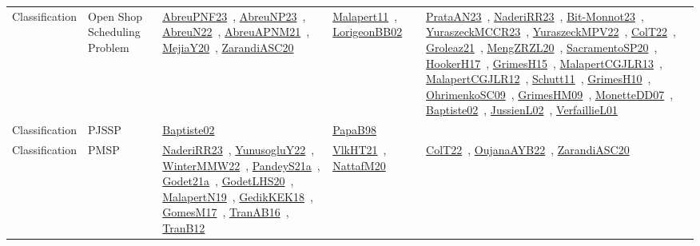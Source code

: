 {\begin{longtable}{lp{3cm}>{\raggedright\arraybackslash}p{6cm}>{\raggedright\arraybackslash}p{6cm}>{\raggedright\arraybackslash}p{8cm}}
Classification & Open Shop Scheduling Problem & \href{../works/AbreuPNF23.pdf}{AbreuPNF23}~\cite{AbreuPNF23}, \href{../works/AbreuNP23.pdf}{AbreuNP23}~\cite{AbreuNP23}, \href{../works/AbreuN22.pdf}{AbreuN22}~\cite{AbreuN22}, \href{../works/AbreuAPNM21.pdf}{AbreuAPNM21}~\cite{AbreuAPNM21}, \href{../works/MejiaY20.pdf}{MejiaY20}~\cite{MejiaY20}, \href{../works/ZarandiASC20.pdf}{ZarandiASC20}~\cite{ZarandiASC20} & \href{../works/Malapert11.pdf}{Malapert11}~\cite{Malapert11}, \href{../works/LorigeonBB02.pdf}{LorigeonBB02}~\cite{LorigeonBB02} & \href{../works/PrataAN23.pdf}{PrataAN23}~\cite{PrataAN23}, \href{../works/NaderiRR23.pdf}{NaderiRR23}~\cite{NaderiRR23}, \href{../works/Bit-Monnot23.pdf}{Bit-Monnot23}~\cite{Bit-Monnot23}, \href{../works/YuraszeckMCCR23.pdf}{YuraszeckMCCR23}~\cite{YuraszeckMCCR23}, \href{../works/YuraszeckMPV22.pdf}{YuraszeckMPV22}~\cite{YuraszeckMPV22}, \href{../works/ColT22.pdf}{ColT22}~\cite{ColT22}, \href{../works/Groleaz21.pdf}{Groleaz21}~\cite{Groleaz21}, \href{../works/MengZRZL20.pdf}{MengZRZL20}~\cite{MengZRZL20}, \href{../works/SacramentoSP20.pdf}{SacramentoSP20}~\cite{SacramentoSP20}, \href{../works/HookerH17.pdf}{HookerH17}~\cite{HookerH17}, \href{../works/GrimesH15.pdf}{GrimesH15}~\cite{GrimesH15}, \href{../works/MalapertCGJLR13.pdf}{MalapertCGJLR13}~\cite{MalapertCGJLR13}, \href{../works/MalapertCGJLR12.pdf}{MalapertCGJLR12}~\cite{MalapertCGJLR12}, \href{../works/Schutt11.pdf}{Schutt11}~\cite{Schutt11}, \href{../works/GrimesH10.pdf}{GrimesH10}~\cite{GrimesH10}, \href{../works/OhrimenkoSC09.pdf}{OhrimenkoSC09}~\cite{OhrimenkoSC09}, \href{../works/GrimesHM09.pdf}{GrimesHM09}~\cite{GrimesHM09}, \href{../works/MonetteDD07.pdf}{MonetteDD07}~\cite{MonetteDD07}, \href{../works/Baptiste02.pdf}{Baptiste02}~\cite{Baptiste02}, \href{../works/JussienL02.pdf}{JussienL02}~\cite{JussienL02}, \href{../works/VerfaillieL01.pdf}{VerfaillieL01}~\cite{VerfaillieL01}\\
Classification & PJSSP & \href{../works/Baptiste02.pdf}{Baptiste02}~\cite{Baptiste02} & \href{../works/PapaB98.pdf}{PapaB98}~\cite{PapaB98} & \\
Classification & PMSP & \href{../works/NaderiRR23.pdf}{NaderiRR23}~\cite{NaderiRR23}, \href{../works/YunusogluY22.pdf}{YunusogluY22}~\cite{YunusogluY22}, \href{../works/WinterMMW22.pdf}{WinterMMW22}~\cite{WinterMMW22}, \href{../works/PandeyS21a.pdf}{PandeyS21a}~\cite{PandeyS21a}, \href{../works/Godet21a.pdf}{Godet21a}~\cite{Godet21a}, \href{../works/GodetLHS20.pdf}{GodetLHS20}~\cite{GodetLHS20}, \href{../works/MalapertN19.pdf}{MalapertN19}~\cite{MalapertN19}, \href{../works/GedikKEK18.pdf}{GedikKEK18}~\cite{GedikKEK18}, \href{../works/GomesM17.pdf}{GomesM17}~\cite{GomesM17}, \href{../works/TranAB16.pdf}{TranAB16}~\cite{TranAB16}, \href{../works/TranB12.pdf}{TranB12}~\cite{TranB12} & \href{../works/VlkHT21.pdf}{VlkHT21}~\cite{VlkHT21}, \href{../works/NattafM20.pdf}{NattafM20}~\cite{NattafM20} & \href{../works/ColT22.pdf}{ColT22}~\cite{ColT22}, \href{../works/OujanaAYB22.pdf}{OujanaAYB22}~\cite{OujanaAYB22}, \href{../works/ZarandiASC20.pdf}{ZarandiASC20}~\cite{ZarandiASC20}\\

\end{longtable}}
